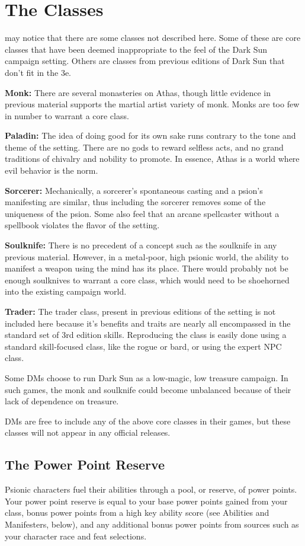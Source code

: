 \section{The Classes}

 may notice that there are some classes not described here. Some of these are core classes that have been deemed inappropriate to the feel of the Dark Sun campaign setting. Others are classes from previous editions of Dark Sun that don't fit in the 3e.

\textbf{Monk:} There are several monasteries on Athas, though little evidence in previous material supports the martial artist variety of monk. Monks are too few in number to warrant a core class.

\textbf{Paladin:} The idea of doing good for its own sake runs contrary to the tone and theme of the setting. There are no gods to reward selfless acts, and no grand traditions of chivalry and nobility to promote. In essence, Athas is a world where evil behavior is the norm.

\textbf{Sorcerer:} Mechanically, a sorcerer's spontaneous casting and a psion's manifesting are similar, thus including the sorcerer removes some of the uniqueness of the psion. Some also feel that an arcane spellcaster without a spellbook violates the flavor of the setting.

\textbf{Soulknife:} There is no precedent of a concept such as the soulknife in any previous material. However, in a metal‐poor, high psionic world, the ability to manifest a weapon using the mind has its place. There would probably not be enough soulknives to warrant a core class, which would need to be shoehorned into the existing campaign world.

\textbf{Trader:} The trader class, present in previous editions of the setting is not included here because it's benefits and traits are nearly all encompassed in the standard set of 3rd edition skills. Reproducing the class is easily done using a standard skill‐focused class, like the rogue or bard, or using the expert NPC class.

Some DMs choose to run Dark Sun as a low‐magic, low treasure campaign. In such games, the monk and soulknife could become unbalanced because of their lack of dependence on treasure.

DMs are free to include any of the above core classes in their games, but these classes will not appear in any official releases.

\subsection{The Power Point Reserve}
Psionic characters fuel their abilities through a pool, or reserve, of power points. Your power point reserve is equal to your base power points gained from your class, bonus power points from a high key ability score (see Abilities and Manifesters, below), and any additional bonus power points from sources such as your character race and feat selections.

